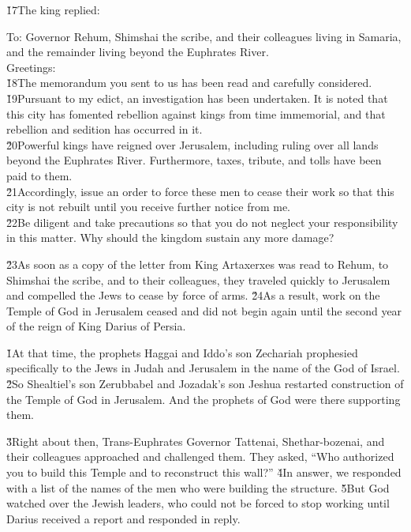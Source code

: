 \v{17}The king replied:

\begin{poetry}
\poeml To: Governor Rehum, Shimshai the scribe, and their colleagues living in Samaria, and the remainder living beyond the Euphrates River. \\
\poeml Greetings: \\
\poeml \v{18}The memorandum you sent to us has been read and carefully considered. \v{19}Pursuant to my edict, an investigation has been undertaken. It is noted that this city has fomented rebellion against kings from time immemorial, and that rebellion and sedition has occurred in it. \\
\poeml \v{20}Powerful kings have reigned over Jerusalem, including ruling over all lands beyond the Euphrates River. Furthermore, taxes, tribute, and tolls have been paid to them. \\
\poeml \v{21}Accordingly, issue an order to force these men to cease their work so that this city is not rebuilt until you receive further notice from me. \\
\poeml \v{22}Be diligent and take precautions so that you do not neglect your responsibility in this matter. Why should the kingdom sustain any more damage?
\end{poetry}

\v{23}As soon as a copy of the letter from King Artaxerxes was read to Rehum, to Shimshai the scribe, and to their colleagues, they traveled quickly to Jerusalem and compelled the Jews to cease by force of arms. \v{24}As a result, work on the Temple of God in Jerusalem ceased and did not begin again until the second year of the reign of King Darius of Persia.

\v{1}At that time, the prophets Haggai and Iddo's son Zechariah prophesied specifically to the Jews in Judah and Jerusalem in the name of the God of Israel. \v{2}So Shealtiel's son Zerubbabel and Jozadak's son Jeshua restarted construction of the Temple of God in Jerusalem. And the prophets of God were there supporting them.

\v{3}Right about then, Trans-Euphrates Governor Tattenai, Shethar-bozenai, and their colleagues approached and challenged them. They asked, ``Who authorized you to build this Temple and to reconstruct this wall?'' \v{4}In answer, we responded with a list of the names of the men who were building the structure. \v{5}But God watched over the Jewish leaders, who could not be forced to stop working until Darius received a report and responded in reply.

